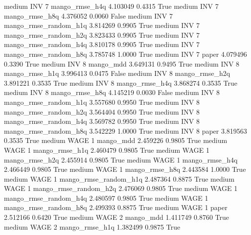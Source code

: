     medium      INV                 7        mango_rmse_h4q   4.103049      0.4315    True
    medium      INV                 7        mango_rmse_h8q   4.376052      0.0060   False
    medium      INV                 7 mango_rmse_random_h1q   3.814269      0.9905    True
    medium      INV                 7 mango_rmse_random_h2q   3.823433      0.9905    True
    medium      INV                 7 mango_rmse_random_h4q   3.810178      0.9905    True
    medium      INV                 7 mango_rmse_random_h8q   3.785748      1.0000    True
    medium      INV                 7                 paper   4.079496      0.3390    True
    medium      INV                 8             mango_mdd   3.649131      0.9495    True
    medium      INV                 8        mango_rmse_h1q   3.996413      0.0475   False
    medium      INV                 8        mango_rmse_h2q   3.891221      0.3535    True
    medium      INV                 8        mango_rmse_h4q   3.868274      0.3535    True
    medium      INV                 8        mango_rmse_h8q   4.145219      0.0030   False
    medium      INV                 8 mango_rmse_random_h1q   3.557680      0.9950    True
    medium      INV                 8 mango_rmse_random_h2q   3.564404      0.9950    True
    medium      INV                 8 mango_rmse_random_h4q   3.569782      0.9950    True
    medium      INV                 8 mango_rmse_random_h8q   3.542229      1.0000    True
    medium      INV                 8                 paper   3.819563      0.3535    True
    medium     WAGE                 1             mango_mdd   2.459226      0.9805    True
    medium     WAGE                 1        mango_rmse_h1q   2.460479      0.9805    True
    medium     WAGE                 1        mango_rmse_h2q   2.455914      0.9805    True
    medium     WAGE                 1        mango_rmse_h4q   2.466449      0.9805    True
    medium     WAGE                 1        mango_rmse_h8q   2.443584      1.0000    True
    medium     WAGE                 1 mango_rmse_random_h1q   2.487364      0.8875    True
    medium     WAGE                 1 mango_rmse_random_h2q   2.476069      0.9805    True
    medium     WAGE                 1 mango_rmse_random_h4q   2.480597      0.9805    True
    medium     WAGE                 1 mango_rmse_random_h8q   2.499393      0.8875    True
    medium     WAGE                 1                 paper   2.512166      0.6420    True
    medium     WAGE                 2             mango_mdd   1.411749      0.8760    True
    medium     WAGE                 2        mango_rmse_h1q   1.382499      0.9875    True
